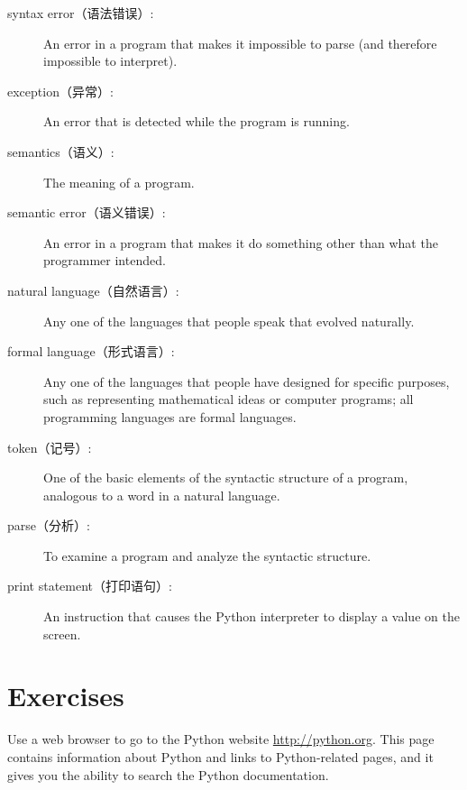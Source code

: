 \documentclass[10pt]{book}
\begin{document}
\begin{CJK}{UTF8}{gbsn}
\begin{description}
\item[syntax error（语法错误）:]  An error in a program that makes it impossible
to parse (and therefore impossible to interpret).

\item[exception（异常）:]  An error that is detected while the program is running.

\item[semantics（语义）:]  The meaning of a program.

\item[semantic error（语义错误）:]   An error in a program that makes it do something
other than what the programmer intended.

\item[natural language（自然语言）:]  Any one of the languages that people speak that
evolved naturally.

\item[formal language（形式语言）:]  Any one of the languages that people have designed
for specific purposes, such as representing mathematical ideas or
computer programs; all programming languages are formal languages.

\item[token（记号）:]  One of the basic elements of the syntactic structure of
a program, analogous to a word in a natural language.

\item[parse（分析）:]  To examine a program and analyze the syntactic structure.

\item[print statement（打印语句）:]  An instruction that causes the Python
interpreter to display a value on the screen.


\end{description}


\section{Exercises}

\begin{exercise}

Use a web browser to go to the Python website \url{http://python.org}.
This page contains information about Python and links
to Python-related pages, and it gives you the ability to search
the Python documentation.


\end{exercise}
\end{CJK}
\end{document}
